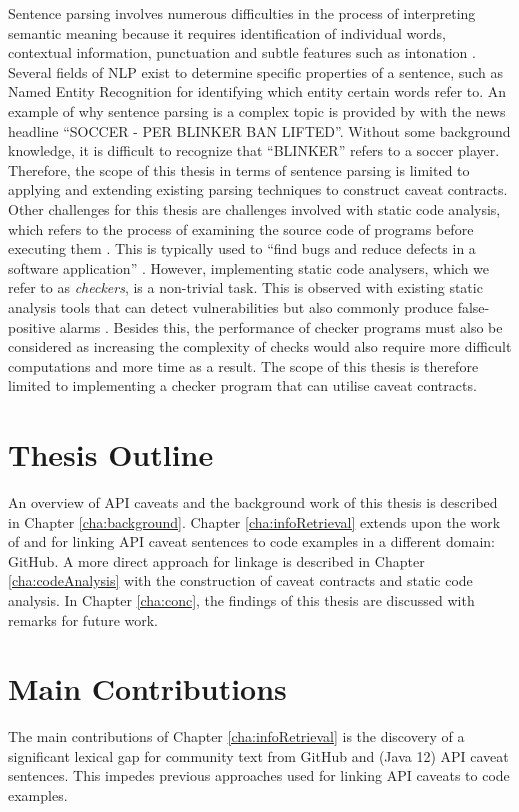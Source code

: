 Sentence parsing involves numerous difficulties in the process of interpreting semantic meaning because it requires identification of individual words, contextual information, punctuation and subtle features such as intonation \cite{mitchell1994sentence}. Several fields of NLP exist to determine specific properties of a sentence, such as Named Entity Recognition for identifying which entity certain words refer to. An example of why sentence parsing is a complex topic is provided by \cite{ratinov-roth-2009-design} with the news headline ``SOCCER - PER BLINKER BAN LIFTED''. Without some background knowledge, it is difficult to recognize that ``BLINKER'' refers to a soccer player.  Therefore, the scope of this thesis in terms of sentence parsing is limited to applying and extending existing parsing techniques to construct caveat contracts. \\
Other challenges for this thesis are challenges involved with static code analysis, which refers to the process of examining the source code of programs before executing them \cite{baca2009static}. This is typically used to ``find bugs and reduce defects in a software application'' \cite{bardas2010static}. However, implementing static code analysers, which we refer to as \textit{checkers}, is a non-trivial task. This is observed with existing static analysis tools that can detect vulnerabilities but also commonly produce false-positive alarms \cite{zitser2004testing}. Besides this, the performance of checker programs must also be considered as increasing the complexity of checks would also require more difficult computations and more time as a result. The scope of this thesis is therefore limited to implementing a checker program that can utilise caveat contracts. 

\section{Thesis Outline}
\label{sec:outline}
An overview of API caveats and the background work of this thesis is described in Chapter \ref{cha:background}. Chapter \ref{cha:infoRetrieval} extends upon the work of \cite{jiamou} and \cite{xiaoxue} for linking API caveat sentences to code examples in a different domain: GitHub. A more direct approach for linkage is described in Chapter \ref{cha:codeAnalysis} with the construction of caveat contracts and static code analysis. In Chapter \ref{cha:conc}, the findings of this thesis are discussed with remarks for future work.

\section{Main Contributions}
The main contributions of Chapter \ref{cha:infoRetrieval} is the discovery of a significant lexical gap for community text from GitHub and (Java 12) API caveat sentences. This impedes previous approaches used for linking API caveats to code examples.\\

